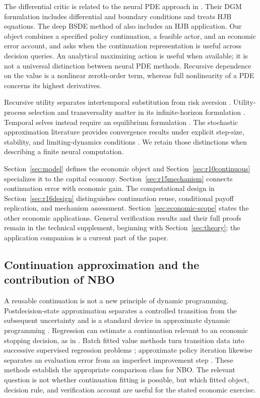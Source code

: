 \documentclass[ecta,nameyear,draft]{econsocart}
\theoremstyle{definition}
\theoremstyle{remark}
\begin{document}
The differential critic is related to the neural PDE approach in \citet{sirignano2018}. Their DGM formulation includes differential and boundary conditions and treats HJB equations. The deep BSDE method of \citet{han2018} also includes an HJB application. Our object combines a specified policy continuation, a feasible actor, and an economic error account, and asks when the continuation representation is useful across decision queries. An analytical maximizing action is useful when available; it is not a universal distinction between neural PDE methods. Recursive dependence on the value is a nonlinear zeroth-order term, whereas full nonlinearity of a PDE concerns its highest derivatives.

Recursive utility separates intertemporal substitution from risk aversion \citep{epsteinzin1989,duffieepstein1992}. Utility-process selection and transversality matter in its infinite-horizon formulation \citep{herdegen2021}. Temporal selves instead require an equilibrium formulation \citep{bjork2016}. The stochastic approximation literature provides convergence results under explicit step-size, stability, and limiting-dynamics conditions \citep{borkar2024}. We retain those distinctions when describing a finite neural computation.

Section~\ref{sec:model} defines the economic object and Section~\ref{sec:r10continuous} specializes it to the capital economy. Section~\ref{sec:r15mechanism} connects continuation error with economic gain. The computational design in Section~\ref{sec:r16design} distinguishes continuation reuse, conditional payoff replication, and mechanism assessment. Section~\ref{sec:economic-scope} states the other economic applications. General verification results and their full proofs remain in the technical supplement, beginning with Section~\ref{sec:theory}; the application companion is a current part of the paper.

\subsection{Continuation approximation and the contribution of NBO}
A reusable continuation is not a new principle of dynamic programming.
Postdecision-state approximation separates a controlled transition from the
subsequent uncertainty and is a standard device in approximate dynamic
programming \citep{powell2011}. Regression can estimate a continuation relevant
to an economic stopping decision, as in \citet{longstaff2001}. Batch fitted
value methods turn transition data into successive supervised regression
problems \citep{ernst2005}; approximate policy iteration likewise separates
an evaluation error from an imperfect improvement step
\citep{scherrer2015}. These methods establish the appropriate comparison
class for NBO. The relevant question is not whether continuation fitting is
possible, but which fitted object, decision rule, and verification account
are useful for the stated economic exercise.
\end{document}
